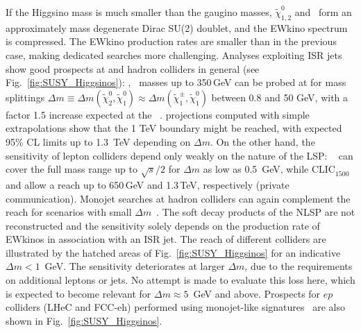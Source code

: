 \documentclass[../report.tex]{subfiles}
\begin{document}
If the Higgsino mass is much smaller than the gaugino masses, $\tilde \chi_{1,2}^0$ and \chiOnePM~form an approximately mass degenerate Dirac SU(2) doublet, and the EWkino spectrum is compressed. 
The EWkino production rates are smaller than in the previous case, making dedicated searches more challenging. Analyses exploiting ISR jets show good prospects at \HLLHC and hadron colliders in general (see Fig.~\ref{fig:SUSY_Higgsinos}):
\chiOnePM, \chiTwoZero~masses up to 350\,GeV can be probed at \HLLHC for mass splittings $\Delta m \equiv \Delta m (\tilde \chi_2^0,\tilde \chi_1^0 )\approx \Delta m (\tilde \chi_1^\pm,\tilde \chi_1^0 )$ between 0.8 and 50 GeV, 
with a factor 1.5 increase expected at the \HELHC~\cite{CidVidal:2018eel}. 
\FCChh projections computed with simple extrapolations show that the 1 TeV boundary might be reached, with expected 95\% CL limits up to 1.3~TeV depending on $\Delta m$.
On the other hand, the sensitivity of lepton colliders depend only weakly on the nature of the LSP: \ILCFiveHundred~\cite{Antusch:2017pkq} can cover the full mass range up to $\sqrt{s}/2$ for $\Delta m$ as low as 0.5~GeV, while CLIC$^{}_{1500}$ and \CLICThreeThousand allow a reach up to 650\,GeV and 1.3\,TeV, respectively (private communication).  
Monojet searches at hadron colliders can again complement the reach for scenarios with small $\Delta m$~\cite{CidVidal:2018eel}. The soft decay products of the NLSP are not reconstructed and the sensitivity solely depends on the production rate of EWkinos in association with an ISR jet. The reach of different colliders are illustrated by the hatched areas of Fig.~\ref{fig:SUSY_Higgsinos} for an indicative $\Delta m<1$~GeV. The sensitivity deteriorates at larger $\Delta m$, due to the requirements on additional leptons or jets. No attempt is made to evaluate this loss here, which is expected to become relevant for $\Delta m \approx 5$~GeV and above. Prospects for $ep$ colliders (LHeC and FCC-eh) performed using monojet-like signatures~\cite{Abada:2019lih} are also shown in Fig.~\ref{fig:SUSY_Higgsinos}.
\end{document}
